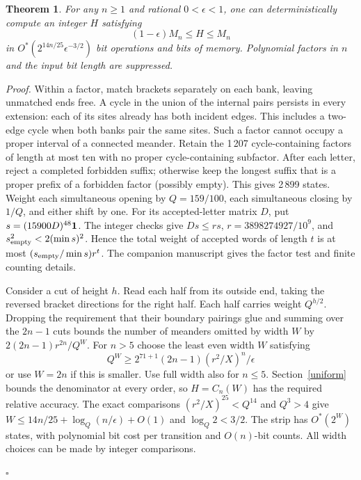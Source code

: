 \documentclass[11pt]{article}
\newenvironment{proof}[1][Proof]{\par\noindent\textit{#1.} }{\unskip\nobreak\hfill\hbox{$\square$}\par}
\newtheorem{theorem}{Theorem}
\newcommand{\prefbits}{71}
\begin{document}
\begin{theorem}\label{accuracy}
For any \(n\ge1\) and rational \(0<\epsilon<1\), one can deterministically compute an integer \(H\) satisfying
\[
      (1-\epsilon)M_n\le H\le M_n
\]
in \(O^*(2^{14n/25}\epsilon^{-3/2})\) bit operations and bits of memory. Polynomial factors in \(n\) and the input bit length are suppressed.
\end{theorem}
\begin{proof}
Within a factor, match brackets separately on each bank, leaving unmatched ends free. A cycle in the union of the internal pairs persists in every extension: each of its sites already has both incident edges. This includes a two-edge cycle when both banks pair the same sites. Such a factor cannot occupy a proper interval of a connected meander. Retain the 1\,207 cycle-containing factors of length at most ten with no proper cycle-containing subfactor. After each letter, reject a completed forbidden suffix; otherwise keep the longest suffix that is a proper prefix of a forbidden factor (possibly empty). This gives 2\,899 states. Weight each simultaneous opening by \(Q=159/100\), each simultaneous closing by \(1/Q\), and either shift by one. For its accepted-letter matrix \(D\), put \(s=(15900D)^{48}{\bf1}\). The integer checks give \(Ds\le r s\), \(r=3898274927/10^9\), and \(s_{\rm empty}^2<2(\min s)^2\). Hence the total weight of accepted words of length \(t\) is at most \((s_{\rm empty}/\min s)r^t\). The companion manuscript \cite{halves} gives the factor test and finite counting details.

Consider a cut of height \(h\). Read each half from its outside end, taking the reversed bracket directions for the right half. Each half carries weight \(Q^{h/2}\). Dropping the requirement that their boundary pairings glue and summing over the \(2n-1\) cuts bounds the number of meanders omitted by width \(W\) by \(2(2n-1)r^{2n}/Q^W\). For \(n>5\) choose the least even width \(W\) satisfying
\[
 Q^W\ge 2^{\prefbits+1}(2n-1)(r^2/X)^n/\epsilon
\]
or use \(W=2n\) if this is smaller. Use full width also for \(n\le5\). Section~\ref{uniform} bounds the denominator at every order, so \(H=C_n(W)\) has the required relative accuracy.
The exact comparisons \((r^2/X)^{25}<Q^{14}\) and \(Q^3>4\) give \(W\le 14n/25+\log_Q(n/\epsilon)+O(1)\) and \(\log_Q2<3/2\). The strip has \(O^*(2^W)\) states, with polynomial bit cost per transition and \(O(n)\)-bit counts. All width choices can be made by integer comparisons.

\end{proof}
\end{document}
